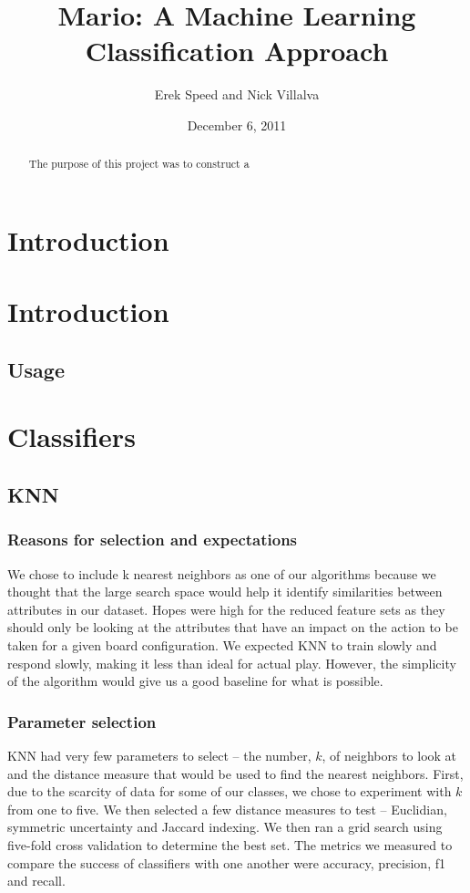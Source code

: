 \documentclass[]{article}   %
\begin{document}
\title{Mario: A Machine Learning Classification Approach}   %
\author{Erek Speed and Nick Villalva}         %
\date{December 6, 2011}    %
\maketitle

\begin{abstract}
 The purpose of this project was to construct a 
\end{abstract}


\section{Introduction}     %


\section{Introduction}     %
\subsection{Usage}         %

\section{Classifiers}
\subsection{KNN}
\subsubsection{Reasons for selection and expectations}
We chose to include k nearest neighbors as one of our algorithms because we thought that the large search space would help it identify similarities between attributes in our dataset. Hopes were high for the reduced feature sets as they should only be looking at the attributes that have an impact on the action to be taken for a given board configuration.  We expected KNN to train slowly and respond slowly, making it less than ideal for actual play. However, the simplicity of the algorithm would give us a good baseline for what is possible.
\subsubsection{Parameter selection}
KNN had very few parameters to select – the number, $k$, of neighbors to look at and the distance measure that would be used to find the nearest neighbors. First, due to the scarcity of data for some of our classes, we chose to experiment with $k$ from one to five. We then selected a few distance measures to test – Euclidian, symmetric uncertainty and Jaccard indexing. We then ran a grid search using five-fold cross validation to determine the best set. The metrics we measured to compare the success of classifiers with one another were accuracy, precision, f1 and recall. 



\begin{thebibliography}{9}
\end{thebibliography}
\end{document}
